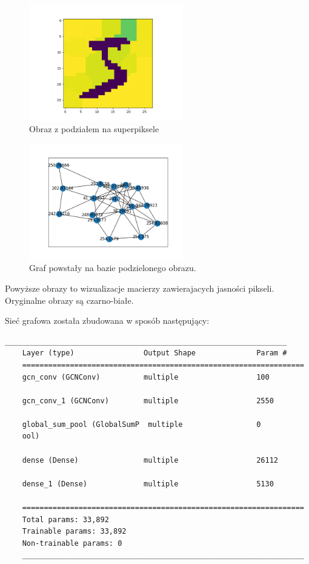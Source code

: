 \documentclass{article}
\begin{document}
\begin{figure}[H]
    \centering
    \includegraphics[width=0.6\textwidth]{img/5Sliced.png}
    \caption{Obraz z podziałem na superpiksele}
\end{figure}

\begin{figure}[H]
    \centering
    \includegraphics[width=0.6\textwidth]{img/5Graph.png}
    \caption{Graf powstały na bazie podzielonego obrazu.}
\end{figure}

Powyższe obrazy to wizualizacje macierzy zawierajacych jasności pikseli.
Oryginalne obrazy są czarno-białe.

Sieć grafowa została zbudowana w sposób następujący:
\begin{lstlisting}[style=siec]
    _________________________________________________________________
    Layer (type)                Output Shape              Param #
    =================================================================
    gcn_conv (GCNConv)          multiple                  100

    gcn_conv_1 (GCNConv)        multiple                  2550

    global_sum_pool (GlobalSumP  multiple                 0
    ool)

    dense (Dense)               multiple                  26112

    dense_1 (Dense)             multiple                  5130

    =================================================================
    Total params: 33,892
    Trainable params: 33,892
    Non-trainable params: 0
    _________________________________________________________________
\end{lstlisting}
\end{document}
